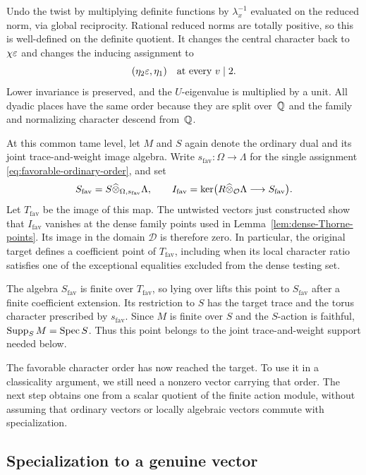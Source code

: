 Undo the twist by multiplying definite functions by
$\lambda_x^{-1}$ evaluated on the reduced norm, via global reciprocity.
Rational reduced norms are totally positive, so this is well-defined
on the definite quotient.  It changes the central character back to
$\chi\varepsilon$ and changes the inducing assignment to
\begin{equation}\label{eq:favorable-ordinary-order}
                       (\eta_2\varepsilon,\eta_1)
                 \quad\text{at every }v\mid2.
\end{equation}
Lower invariance is preserved, and the $U$-eigenvalue is multiplied by
a unit.  All dyadic places have the same order because they are split
over~$\mathbb Q$ and the family and normalizing character descend from~$\mathbb Q$.

At this common tame level, let $M$ and $S$ again denote the ordinary
dual and its joint trace-and-weight image algebra.  Write
$s_{\mathrm{fav}}:\Omega\to\Lambda$ for the single assignment
\eqref{eq:favorable-ordinary-order}, and set
\[
 S_{\mathrm{fav}}
   =S\widehat\otimes_{\Omega,s_{\mathrm{fav}}}\Lambda,
 \qquad
 I_{\mathrm{fav}}
   =\ker\bigl(R\widehat\otimes_{\mathcal O}\Lambda
                         \longrightarrow S_{\mathrm{fav}}\bigr).
\]
Let $T_{\mathrm{fav}}$ be the image of this map.  The untwisted vectors
just constructed show that $I_{\mathrm{fav}}$ vanishes at the dense
family points used in Lemma~\ref{lem:dense-Thorne-points}.  Its image
in the domain $\mathscr D$ is therefore zero.  In particular, the
original target defines a coefficient point of $T_{\mathrm{fav}}$,
including when its local character ratio satisfies one of the
exceptional equalities excluded from the dense testing set.

The algebra $S_{\mathrm{fav}}$ is finite over $T_{\mathrm{fav}}$,
so lying over lifts this point to $S_{\mathrm{fav}}$ after a finite
coefficient extension.  Its restriction to $S$ has the target trace
and the torus character prescribed by $s_{\mathrm{fav}}$.
Since $M$ is finite over $S$ and the $S$-action is faithful,
$\operatorname{Supp}_S M=\operatorname{Spec} S$.  Thus this point belongs to the joint
trace-and-weight support needed below.

The favorable character order has now reached the target.  To use it
in a classicality argument, we still need a nonzero vector carrying
that order.  The next step obtains one from a scalar quotient of the
finite action module, without assuming that ordinary vectors or locally
algebraic vectors commute with specialization.

\subsection{Specialization to a genuine vector}

